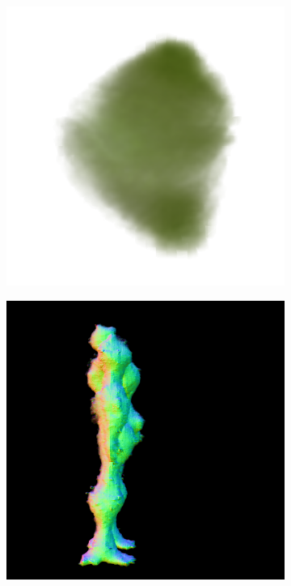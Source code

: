 \begin{figure}[ht]
\begin{subfigure}[b]{0.222\textwidth}
        \includegraphics[width=\textwidth]{etc/a robot made out of plants/magic123/magic123_coarse_robot_left_0_part1.png}
        \caption{}
    \end{subfigure}
    \begin{subfigure}[b]{0.222\textwidth}
        \centering
        \fontsize{9pt}{7pt}\selectfont{}\vspace{.1cm}
        \includegraphics[width=\textwidth]{etc/a robot made out of plants/magic123/magic123_coarse_robot_right_5000_part2.png}

\end{subfigure}
\end{figure}
